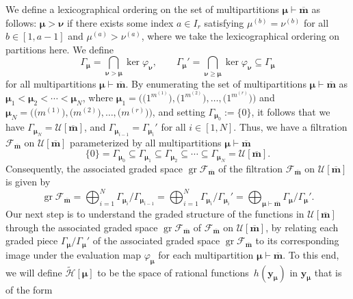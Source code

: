 \documentclass[10pt,a4paper]{amsart}
\numberwithin{equation}{section}
\DeclareMathOperator{\gr}{gr}
\begin{document}
We define a lexicographical ordering on the set of multipartitions $\bm{\mu}\vdash\overline{\mathbf{m}}$ as follows: $\bm{\mu}>\bm{\nu}$ if there exists some index $a\in I_r$ satisfying $\mu^{(b)}=\nu^{(b)}$ for all $b\in[1,a-1]$ and $\mu^{(a)}>\nu^{(a)}$, where we take the lexicographical ordering on partitions here. We define
\begin{equation*}
\Gamma_{\bm{\mu}}=\bigcap_{\bm{\nu}>\bm{\mu}}\ker\varphi_{\bm{\nu}},\qquad\Gamma_{\bm{\mu}}'=\bigcap_{\bm{\nu}\geq\bm{\mu}}\ker\varphi_{\bm{\nu}}\subseteq\Gamma_{\bm{\mu}}
\end{equation*}
for all multipartitions $\bm{\mu}\vdash\overline{\mathbf{m}}$. By enumerating the set of multipartitions $\bm{\mu}\vdash \overline{\mathbf{m}}$ as $\bm{\mu}_1<\bm{\mu}_2<\cdots< \bm{\mu}_N$, where $\bm{\mu}_1=\bigl(\bigl(1^{m^{(1)}}\bigr),\bigl(1^{m^{(2)}}\bigr), \dots,\bigl(1^{m^{(r)}}\bigr)\bigr)$ and $\bm{\mu}_N=\bigl(\bigl(m^{(1)}\bigr),\bigl(m^{(2)}\bigr), \dots,\bigl(m^{(r)}\bigr)\bigr)$, and setting $\Gamma_{\bm{\mu}_0}:=\{0\}$, it follows that we have $\Gamma_{\bm{\mu}_N}=\mathcal{U}[\overline{\mathbf{m}}]$, and $\Gamma_{\bm{\mu}_{i-1}}= \Gamma_{\bm{\mu}_i}'$ for all $i\in [1,N]$. Thus, we have a filtration $\mathcal{F}_{\overline{\mathbf{m}}}$ on $\mathcal{U}[\overline{\mathbf{m}}]$ parameterized by all multipartitions $\bm{\mu}\vdash \overline{\mathbf{m}}$
\begin{equation*}
\{0\}=\Gamma_{\bm{\mu}_0}\subseteq\Gamma_{\bm{\mu}_1} \subseteq \Gamma_{\bm{\mu}_2}\subseteq\cdots\subseteq \Gamma_{\bm{\mu}_N}=\mathcal{U}[\overline{\mathbf{m}}].
\end{equation*}
Consequently, the associated graded space $\gr\mathcal{F}_{\overline{\mathbf{m}}}$ of the filtration $\mathcal{F}_{\overline{\mathbf{m}}}$ on $\mathcal{U}[\overline{\mathbf{m}}]$ is given by
\begin{equation}\label{eq:3.23}
\gr\mathcal{F}_{\overline{\mathbf{m}}}
=\bigoplus_{i=1}^N\Gamma_{\bm{\mu}_i}/\Gamma_{\bm{\mu}_{i-1}}
=\bigoplus_{i=1}^N\Gamma_{\bm{\mu}_i}/\Gamma_{\bm{\mu}_i}'
=\bigoplus_{\bm{\mu}\vdash\overline{\mathbf{m}}} \Gamma_{\bm{\mu}}/\Gamma_{\bm{\mu}}'.
\end{equation}
Our next step is to understand the graded structure of the functions in $\mathcal{U}[\overline{\mathbf{m}}]$ through the associated graded space $\gr\mathcal{F}_{\overline{ \mathbf{m}}}$ of $\mathcal{F}_{\overline{\mathbf{m}}}$ on $\mathcal{U}[\overline{\mathbf{m}}]$, by relating each graded piece $\Gamma_{\bm{\mu}}/\Gamma_{\bm{\mu}}'$ of the associated graded space $\gr\mathcal{F}_{\overline{\mathbf{m}}}$ to its corresponding image under the evaluation map $\varphi_{\bm{ \mu}}$ for each multipartition $\bm{\mu}\vdash\overline{ \mathbf{m}}$. To this end, we will define $\tilde{\mathcal{H}}[\bm{\mu}]$ to be the space of rational functions~$h(\mathbf{ y}_{\bm{\mu}})$ in $\mathbf{y}_{\bm{\mu}}$ that is of the form
\end{document}
